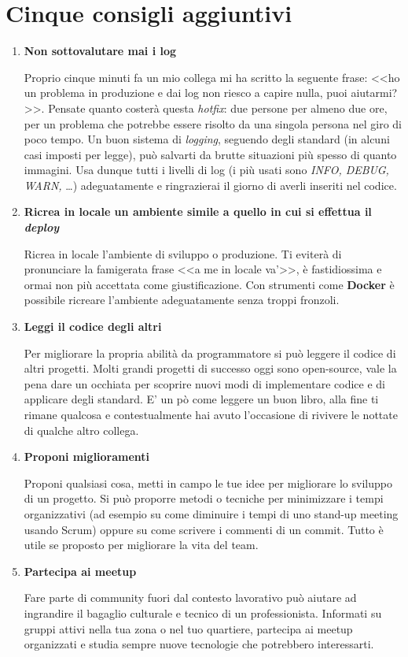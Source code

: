\section{Cinque consigli aggiuntivi}

\begin{enumerate}

\item \textbf{Non sottovalutare mai i log}

Proprio cinque minuti fa un mio collega mi ha scritto la seguente frase: <<ho un problema in produzione e dai log non riesco a capire nulla, puoi aiutarmi?>>.
Pensate quanto costerà questa \emph{hotfix}: due persone per almeno due ore, per un problema che potrebbe essere risolto da una singola persona nel giro di poco tempo. Un buon sistema di \emph{logging}, seguendo degli standard (in alcuni casi imposti per legge), può salvarti da brutte situazioni più spesso di quanto immagini. Usa dunque tutti i livelli di log (i più usati sono \emph{INFO, DEBUG, WARN,} \dots) adeguatamente e ringrazierai il giorno di averli inseriti nel codice. 

\item \textbf{Ricrea in locale un ambiente simile a quello in cui si effettua il \emph{deploy}}

Ricrea in locale l'ambiente di sviluppo o produzione. Ti eviterà di pronunciare la famigerata frase <<a me in locale va'>>, è fastidiossima e ormai non più accettata come giustificazione. Con strumenti come \textbf{Docker} è possibile ricreare l'ambiente adeguatamente senza troppi fronzoli.

\item \textbf{Leggi il codice degli altri}

Per migliorare la propria abilità da programmatore si può leggere il codice di altri progetti. Molti grandi progetti di successo oggi sono open-source, vale la pena dare un occhiata per scoprire nuovi modi di implementare codice e di applicare degli standard. E' un pò come leggere un buon libro, alla fine ti rimane qualcosa e contestualmente hai avuto l'occasione di rivivere le nottate di qualche altro collega.


\item \textbf{Proponi miglioramenti}

Proponi qualsiasi cosa, metti in campo le tue idee per migliorare lo sviluppo di un progetto. Si può proporre metodi o tecniche per minimizzare i tempi organizzativi (ad esempio su come diminuire i tempi di uno stand-up meeting usando Scrum) oppure su come scrivere i commenti di un commit. Tutto è utile se proposto per migliorare la vita del team.

\item \textbf{Partecipa ai meetup}

Fare parte di community fuori dal contesto lavorativo può aiutare ad ingrandire il bagaglio culturale e tecnico di un professionista. Informati su gruppi attivi nella tua zona o nel tuo quartiere, partecipa ai meetup organizzati e studia sempre nuove tecnologie che potrebbero interessarti.


\end{enumerate}